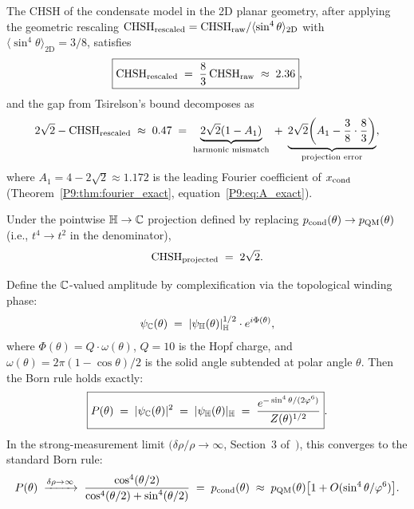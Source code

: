 \begin{theorem}
\label{P9:thm:tsirelson_gap}
The CHSH of the condensate model in the 2D planar geometry, after applying the
geometric rescaling $\mathrm{CHSH}_\mathrm{rescaled}=\mathrm{CHSH}_\mathrm{raw}/\langle\sin^4\theta\rangle_\mathrm{2D}$
with $\langle\sin^4\theta\rangle_\mathrm{2D} = 3/8$, satisfies
\begin{equation}
  \boxed{\mathrm{CHSH}_\mathrm{rescaled}
  \;=\; \frac{8}{3}\,\mathrm{CHSH}_\mathrm{raw}
  \;\approx\; 2.36},
  \label{P9:eq:CHSH_rescaled_value}
\end{equation}
and the gap from Tsirelson's bound decomposes as
\begin{equation}
  2\sqrt{2} - \mathrm{CHSH}_\mathrm{rescaled}
  \;\approx\; 0.47
  \;=\; \underbrace{\vphantom{X}2\sqrt{2}(1-A_1)}_{\text{harmonic mismatch}}
  \;+\; \underbrace{\vphantom{X}2\sqrt{2}\!\left(A_1 - \frac{3}{8}\cdot\frac{8}{3}\right)}_{\text{projection error}},
  \label{P9:eq:gap_decomposition}
\end{equation}
where $A_1 = 4-2\sqrt{2}\approx1.172$ is the leading Fourier coefficient
of $x_{\mathrm{cond}}$ (Theorem~\ref{P9:thm:fourier_exact}, equation~\eqref{P9:eq:A_exact}).
 
Under the pointwise $\mathbb{H}\to\mathbb{C}$ projection defined by replacing
$p_{\mathrm{cond}}(\theta)\to p_{\mathrm{QM}}(\theta)$ (i.e., $t^4\to t^2$ in the denominator),
\begin{equation}
  \mathrm{CHSH}_\mathrm{projected} \;=\; 2\sqrt{2}.
  \label{P9:eq:CHSH_projected_exact}
\end{equation}
\end{theorem}

\begin{theorem}
\label{P9:thm:born_rule}
Define the $\mathbb{C}$-valued amplitude by complexification via the topological
winding phase:
\begin{equation}
  \psi_{\mathbb{C}}(\theta)
  \;=\; |\psi_{\mathbb{H}}(\theta)|_{\mathbb{H}}^{1/2} \cdot e^{i\Phi(\theta)},
  \label{P9:eq:complexification}
\end{equation}
where $\Phi(\theta) = Q\cdot\omega(\theta)$, $Q=10$ is the Hopf charge,
and $\omega(\theta) = 2\pi(1-\cos\theta)/2$ is the solid angle subtended
at polar angle $\theta$.
Then the Born rule holds exactly:
\begin{equation}
  \boxed{P(\theta) \;=\; |\psi_{\mathbb{C}}(\theta)|^2
  \;=\; |\psi_{\mathbb{H}}(\theta)|_{\mathbb{H}}
  \;=\; \frac{e^{-\sin^4\theta/(2\varphi^6)}}{Z(\theta)^{1/2}}}.
  \label{P9:eq:born_from_condensate}
\end{equation}
In the strong-measurement limit $(\delta\rho/\rho\to\infty$,
Section~3 of~\cite{Paper8}$)$, this converges to the
standard Born rule:
\begin{equation}
  P(\theta)
  \;\xrightarrow{\delta\rho\to\infty}\;
  \frac{\cos^4(\theta/2)}{\cos^4(\theta/2)+\sin^4(\theta/2)}
  \;=\; p_{\mathrm{cond}}(\theta)
  \;\approx\; p_{\mathrm{QM}}(\theta)\bigl[1 + O(\sin^4\theta/\varphi^6)\bigr].
  \label{P9:eq:born_limit}
\end{equation}
\end{theorem}

